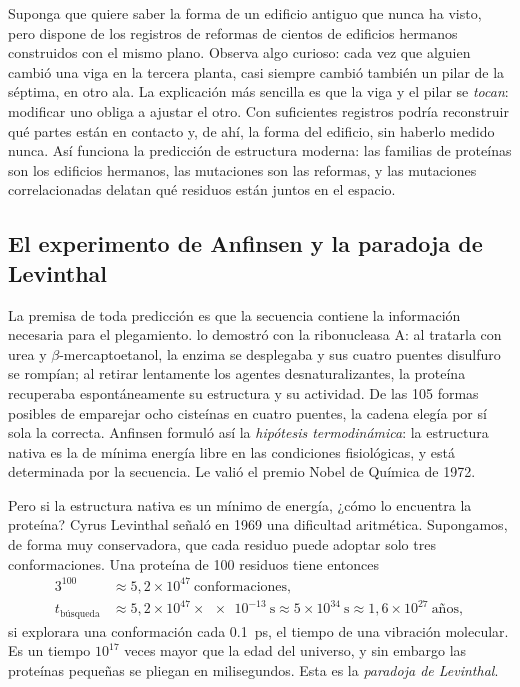\begin{intuicion}
Suponga que quiere saber la forma de un edificio antiguo que nunca ha visto, pero dispone de los registros de reformas de cientos de edificios hermanos construidos con el mismo plano. Observa algo curioso: cada vez que alguien cambió una viga en la tercera planta, casi siempre cambió también un pilar de la séptima, en otro ala. La explicación más sencilla es que la viga y el pilar se \emph{tocan}: modificar uno obliga a ajustar el otro. Con suficientes registros podría reconstruir qué partes están en contacto y, de ahí, la forma del edificio, sin haberlo medido nunca. Así funciona la predicción de estructura moderna: las familias de proteínas son los edificios hermanos, las mutaciones son las reformas, y las mutaciones correlacionadas delatan qué residuos están juntos en el espacio.
\end{intuicion}

\subsection{El experimento de Anfinsen y la paradoja de Levinthal}

La premisa de toda predicción es que la secuencia contiene la información necesaria para el plegamiento. \textcite{c15-anfinsen1973} lo demostró con la ribonucleasa A: al tratarla con urea y $\beta$-mercaptoetanol, la enzima se desplegaba y sus cuatro puentes disulfuro se rompían; al retirar lentamente los agentes desnaturalizantes, la proteína recuperaba espontáneamente su estructura y su actividad. De las 105 formas posibles de emparejar ocho cisteínas en cuatro puentes, la cadena elegía por sí sola la correcta. Anfinsen formuló así la \emph{hipótesis termodinámica}: la estructura nativa es la de mínima energía libre en las condiciones fisiológicas, y está determinada por la secuencia. Le valió el premio Nobel de Química de 1972.

Pero si la estructura nativa es un mínimo de energía, ¿cómo lo encuentra la proteína? Cyrus Levinthal señaló en 1969 una dificultad aritmética. Supongamos, de forma muy conservadora, que cada residuo puede adoptar solo tres conformaciones. Una proteína de 100 residuos tiene entonces
\begin{equation}\label{eq:15-levinthal}
\begin{aligned}
3^{100}&\approx 5{,}2\times10^{47}\ \text{conformaciones},\\
t_{\text{búsqueda}} &\approx 5{,}2\times10^{47}\times\SI{e-13}{\second}\approx 5\times10^{34}\ \si{\second}\approx 1{,}6\times10^{27}\ \text{años},
\end{aligned}
\end{equation}
si explorara una conformación cada \SI{0,1}{\pico\second}, el tiempo de una vibración molecular. Es un tiempo $10^{17}$ veces mayor que la edad del universo, y sin embargo las proteínas pequeñas se pliegan en milisegundos. Esta es la \emph{paradoja de Levinthal}.

